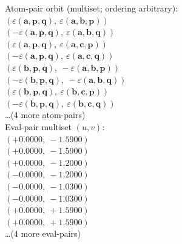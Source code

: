 \documentclass[a4paper,11pt]{article}
\newcommand{\kblbmcpggoncpf}[3]{\varepsilon(\mathbf{#1},\mathbf{#2},\mathbf{#3})}
\begin{document}
\quad Atom-pair orbit (multiset; ordering arbitrary):\\
$(\kblbmcpggoncpf{a}{p}{q},\ \kblbmcpggoncpf{a}{b}{p})$\\
$(-\kblbmcpggoncpf{a}{p}{q},\ \kblbmcpggoncpf{a}{b}{q})$\\
$(\kblbmcpggoncpf{a}{p}{q},\ \kblbmcpggoncpf{a}{c}{p})$\\
$(-\kblbmcpggoncpf{a}{p}{q},\ \kblbmcpggoncpf{a}{c}{q})$\\
$(\kblbmcpggoncpf{b}{p}{q},\ -\kblbmcpggoncpf{a}{b}{p})$\\
$(-\kblbmcpggoncpf{b}{p}{q},\ -\kblbmcpggoncpf{a}{b}{q})$\\
$(\kblbmcpggoncpf{b}{p}{q},\ \kblbmcpggoncpf{b}{c}{p})$\\
$(-\kblbmcpggoncpf{b}{p}{q},\ \kblbmcpggoncpf{b}{c}{q})$\\
\quad \ldots (4 more atom-pairs)\\
\quad Eval-pair multiset $(u, v)$:\\
$(+0.0000,\ -1.5900)$\\
$(+0.0000,\ -1.5900)$\\
$(+0.0000,\ -1.2000)$\\
$(-0.0000,\ -1.2000)$\\
$(-0.0000,\ -1.0300)$\\
$(-0.0000,\ -1.0300)$\\
$(+0.0000,\ +1.5900)$\\
$(+0.0000,\ +1.5900)$\\
\quad \ldots (4 more eval-pairs)\\
\end{document}
